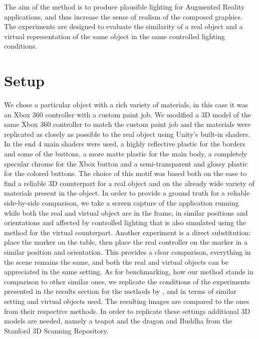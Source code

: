 
 The aim of the method is to produce plausible lighting for Augmented Reality applications, and thus increase the sense of realism of the composed graphics. The experiments are designed to evaluate the similarity of a real object and a virtual representation of the same object in the same controlled lighting conditions.
\section{Setup}
We chose a particular object with a rich variety of materials, in this case it was an Xbox 360 controller with a custom paint job. We modified a 3D model of the same Xbox 360 controller to match the custom paint job and the materials were replicated as closely as possible to the real object using Unity's built-in shaders. In the end 4 main shaders were used, a highly reflective plastic for the borders and some of the buttons, a more matte plastic for the main body, a completely specular chrome for the Xbox button and a semi-transparent and glossy plastic for the colored buttons. The choice of this motif was based both on the ease to find a reliable 3D counterpart for a real object and on the already wide variety of materials present in the object.\newline
In order to provide a ground truth for a reliable side-by-side comparison, we take a screen capture of the application running while both the real and virtual object are in the frame, in similar positions and orientations and affected by controlled lighting that is also simulated using the method for the virtual counterpart. Another experiment is a direct substitution: place the marker on the table, then place the real controller on the marker in a similar position and orientation. This provides a clear comparison, everything in the scene remains the same, and both the real and virtual objects can be appreciated in the same setting.\newline
As for benchmarking, how our method stands in comparison to other similar ones, we replicate the conditions of the experiments presented in the results section for the methods by \citet{kanbara2004}, \citet{karsh2014} and \citet{pessoa2011} in terms of similar setting and virtual objects used. The resulting images are compared to the ones from their respective methods. In order to replicate these settings additional 3D models are needed, namely a teapot and the dragon and Buddha from the Stanford 3D Scanning Repository.\newline
